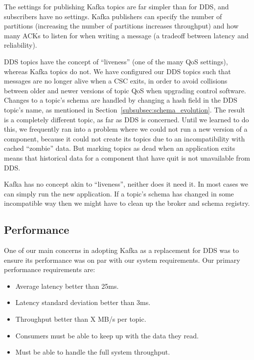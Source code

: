 \documentclass[]{spie}  %
\begin{document}
The settings for publishing Kafka topics are far simpler than for DDS, and subscribers have no settings.
Kafka publishers can specify the number of partitions (increasing the number of partitions increases throughput) and how many ACKs to listen for when writing a message (a tradeoff between latency and reliability).

DDS topics have the concept of “liveness” (one of the many QoS settings), whereas Kafka topics do not.
We have configured our DDS topics such that messages are no longer alive when a CSC exits, in order to avoid collisions between older and newer versions of topic QoS when upgrading control software.
Changes to a topic’s schema are handled by changing a hash field in the DDS topic’s name, as mentioned in Section~\ref{subsubsec:schema_evolution}.
The result is a completely different topic, as far as DDS is concerned.
Until we learned to do this, we frequently ran into a problem where we could not run a new version of a component, because it could not create its topics due to an incompatibility with cached “zombie” data.
But marking topics as dead when an application exits means that historical data for a component that have quit is not unavailable from DDS.

Kafka has no concept akin to “liveness”, neither does it need it.
In most cases we can simply run the new application.
If a topic’s schema has changed in some incompatible way then we might have to clean up the broker and schema registry.

\subsection{Performance}
\label{subsec:performance}

One of our main concerns in adopting Kafka as a replacement for DDS was to ensure its performance was on par with our system requirements.
Our primary performance requirements are:

\begin{itemize}
  \item Average latency better than 25ms.
  \item Latency standard deviation better than 3ms.
  \item Throughput better than X MB/s per topic.
  \item Consumers must be able to keep up with the data they read.
  \item Must be able to handle the full system throughput.
\end{itemize}
\end{document}
